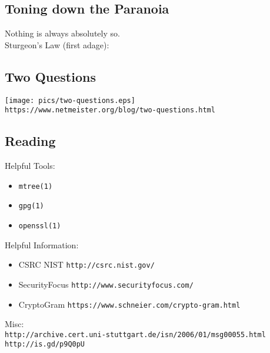 \documentclass[xga]{xdvislides}
\begin{document}
\subsection{Toning down the Paranoia}
\vspace*{\fill}
\Huge
\begin{center}
Nothing is always absolutely so. \\
\vspace{.25in}
\Normalsize
Sturgeon's Law (first adage):
\end{center}
\Normalsize
\vspace*{\fill}

\subsection{Two Questions}
\vspace*{\fill}
\begin{center}
	\texttt{[image: pics/two-questions.eps]} \\
\small
	\verb+https://www.netmeister.org/blog/two-questions.html+
\end{center}
\Normalsize
\vspace*{\fill}

\subsection{Reading}
Helpful Tools:
\begin{itemize}
	\item \verb+mtree(1)+
	\item \verb+gpg(1)+
	\item \verb+openssl(1)+
\end{itemize}
\addvspace{.5in}
Helpful Information:
\begin{itemize}
	\item CSRC NIST \verb+http://csrc.nist.gov/+
	\item SecurityFocus \verb+http://www.securityfocus.com/+
	\item CryptoGram \verb+https://www.schneier.com/crypto-gram.html+
\end{itemize}
\addvspace{.5in}
Misc:
\\

\verb+http://archive.cert.uni-stuttgart.de/isn/2006/01/msg00055.html+
\\

\verb+http://is.gd/p9Q0pU+
\end{document}
